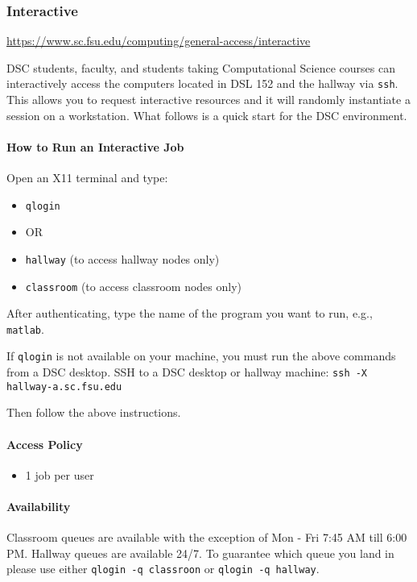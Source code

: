 \documentclass[12pt,a4paper]{article}
\begin{document}
\subsubsection{Interactive}
\url{https://www.sc.fsu.edu/computing/general-access/interactive}

DSC students, faculty, and students taking Computational Science courses can interactively access the computers located in DSL 152 and the hallway via \texttt{ssh}. This allows you to request interactive resources and it will randomly instantiate a session on a workstation. What follows is a quick start for the DSC environment.

\paragraph{How to Run an Interactive Job}
Open an X11 terminal and type:
\begin{itemize}
    \item \texttt{qlogin}
    \item OR
    \item \texttt{hallway} (to access hallway nodes only)
    \item \texttt{classroom} (to access classroom nodes only)
\end{itemize}

After authenticating, type the name of the program you want to run, e.g., \texttt{matlab}.

If \texttt{qlogin} is not available on your machine, you must run the above commands from a DSC desktop. SSH to a DSC desktop or hallway machine:
\texttt{ssh -X hallway-a.sc.fsu.edu}

Then follow the above instructions.

\paragraph{Access Policy}
\begin{itemize}
    \item 1 job per user
\end{itemize}

\paragraph{Availability}
Classroom queues are available with the exception of Mon - Fri 7:45 AM till 6:00 PM.
Hallway queues are available 24/7.
To guarantee which queue you land in please use either \texttt{qlogin -q classroon} or \texttt{qlogin -q hallway}.
\end{document}
